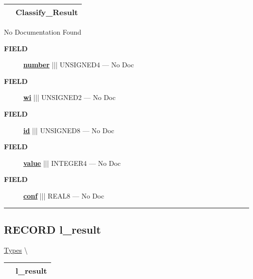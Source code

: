{\renewcommand{\arraystretch}{1.5}
\begin{tabularx}{\textwidth}{|>{\raggedright\arraybackslash}l|X|}
\hline
\hspace{0pt}\mytexttt{\color{red} } & \textbf{Classify\_Result} \\
\hline
\end{tabularx}
}

\par





No Documentation Found







\par
\begin{description}
\item [\colorbox{tagtype}{\color{white} \textbf{\textsf{FIELD}}}] \textbf{\underline{number}} ||| UNSIGNED4 --- No Doc
\item [\colorbox{tagtype}{\color{white} \textbf{\textsf{FIELD}}}] \textbf{\underline{wi}} ||| UNSIGNED2 --- No Doc
\item [\colorbox{tagtype}{\color{white} \textbf{\textsf{FIELD}}}] \textbf{\underline{id}} ||| UNSIGNED8 --- No Doc
\item [\colorbox{tagtype}{\color{white} \textbf{\textsf{FIELD}}}] \textbf{\underline{value}} ||| INTEGER4 --- No Doc
\item [\colorbox{tagtype}{\color{white} \textbf{\textsf{FIELD}}}] \textbf{\underline{conf}} ||| REAL8 --- No Doc
\end{description}





\rule{\linewidth}{0.5pt}
\subsection*{\textsf{\colorbox{headtoc}{\color{white} RECORD}
l\_result}}

\hypertarget{ecldoc:ml_core.types.l_result}{}
\hspace{0pt} \hyperlink{ecldoc:ML_Core.Types}{Types} \textbackslash 

{\renewcommand{\arraystretch}{1.5}
\begin{tabularx}{\textwidth}{|>{\raggedright\arraybackslash}l|X|}
\hline
\hspace{0pt}\mytexttt{\color{red} } & \textbf{l\_result} \\
\hline
\end{tabularx}
}

